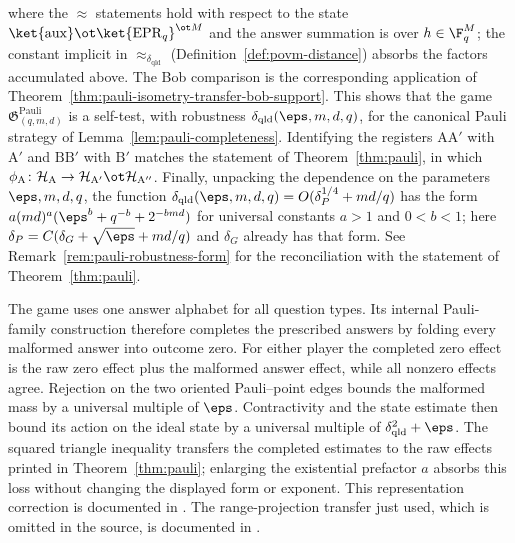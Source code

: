 \begin{remark}
	where the $\approx$ statements hold with respect to the state $\ket{\mathrm{aux}} \ot \ket{\mathrm{EPR}_q}^{\ot M}$ and the answer summation is over $h \in \F_q^M$; the constant implicit in $\approx_{\delta_{\mathrm{qld}}}$ (Definition~\ref{def:povm-distance}) absorbs the factors accumulated above. The Bob comparison is the corresponding application of Theorem~\ref{thm:pauli-isometry-transfer-bob-support}. This shows that the game $\mathfrak{G}^{\mathrm{Pauli}}_{(q,m,d)}$ is a self-test, with robustness $\delta_{\mathrm{qld}}(\eps,m,d,q)$, for the canonical Pauli strategy of Lemma~\ref{lem:pauli-completeness}. Identifying the registers $\mathrm{A}\mathrm{A}'$ with $\mathrm{A}'$ and $\mathrm{B}\mathrm{B}'$ with $\mathrm{B}'$ matches the statement of Theorem~\ref{thm:pauli}, in which $\phi_{\mathrm{A}}\colon \mathcal{H}_{\mathrm{A}} \to \mathcal{H}_{\mathrm{A}'} \ot \mathcal{H}_{\mathrm{A}''}$. Finally, unpacking the dependence on the parameters $\eps, m, d, q$, the function $\delta_{\mathrm{qld}}(\eps,m,d,q) = O(\delta_P^{1/4} + md/q)$ has the form $a(md)^a(\eps^b + q^{-b} + 2^{-bmd})$ for universal constants $a > 1$ and $0 < b < 1$; here $\delta_P = C(\delta_G + \sqrt{\eps} + md/q)$ and $\delta_G$ already has that form. See Remark~\ref{rem:pauli-robustness-form} for the reconciliation with the statement of Theorem~\ref{thm:pauli}.

	The game uses one answer alphabet for all question types. Its
	internal Pauli-family construction therefore completes the prescribed
	answers by folding every malformed answer into outcome zero.  For either
	player the completed zero effect is the raw zero effect plus the malformed
	answer effect, while all nonzero effects agree.  Rejection on the two
	oriented Pauli--point edges bounds the malformed mass by a universal
	multiple of $\eps$.  Contractivity and the state estimate then bound its
	action on the ideal state by a universal multiple of
	$\delta_{\mathrm{qld}}^2+\eps$.  The squared triangle inequality transfers
	the completed estimates to the raw effects printed in
	Theorem~\ref{thm:pauli}; enlarging the existential prefactor $a$ absorbs
	this loss without changing the displayed form or exponent.  This
	representation correction is documented in
	\cite{gap:qpbt_raw-pauli-effects}.
	The range-projection transfer just used, which is omitted in the source,
	is documented in \cite{gap:qpbt_extraction-transfer}.
\end{remark}

